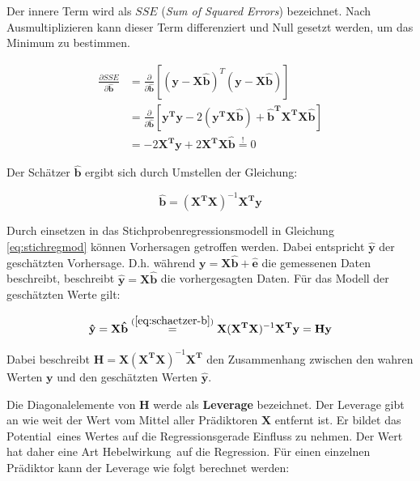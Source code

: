 \documentclass{article}
\numberwithin{equation}{section}
\begin{document}
Der innere Term wird als $SSE$ (\emph{Sum of Squared Errors}) bezeichnet. Nach Ausmultiplizieren kann dieser Term differenziert und Null gesetzt werden, um das Minimum zu bestimmen.

\begin{equation}
\begin{split}
\frac{\partial SSE}{\partial \mathbf{\hat b}} &= \frac{\partial }{\partial \mathbf{\hat b}} \left[ \left( \mathbf{y} - \mathbf{X}\mathbf{\hat b} \right)^T \left( \mathbf{y} - \mathbf{X}\mathbf{\hat b} \right) \right] \\
&= \frac{\partial }{\partial \mathbf{\hat b}} \left[ \mathbf{y^T y} - 2(\mathbf{y^T X \hat b}) + \mathbf{\hat b^T X^T X \hat b} \right] \\
&= -2 \mathbf{X^T y} + 2 \mathbf{X^T X \hat b} \overset{!}{=} 0
\end{split}
\end{equation}

Der Schätzer $\mathbf{\hat b}$ ergibt sich durch Umstellen der Gleichung:

\begin{equation}
\label{eq:schaetzer-b}
\mathbf{\hat b} = (\mathbf{X^T X})^{-1} \mathbf{X^T y}
\end{equation}

Durch einsetzen in das Stichprobenregressionsmodell in Gleichung \ref{eq:stichregmod} können Vorhersagen getroffen werden. Dabei entspricht $\mathbf{\hat y}$ der geschätzten Vorhersage. D.h. während $\mathbf{y} = \mathbf{X}\mathbf{\hat b} + \mathbf{\hat e}$ die gemessenen Daten beschreibt, beschreibt $\mathbf{\hat y} = \mathbf{X}\mathbf{\hat b}$ die vorhergesagten Daten. Für das Modell der geschätzten Werte gilt:

\begin{equation}
\mathbf{\hat y} = \mathbf{X}\mathbf{\hat b} \overset{(\ref{eq:schaetzer-b})}{=} \mathbf{X} (\mathbf{X^T X})^{-1} \mathbf{X^T y} = \mathbf{H y}
\end{equation}

Dabei beschreibt $\mathbf{H} = \mathbf{X} (\mathbf{X^T X})^{-1} \mathbf{X^T}$ den Zusammenhang zwischen den wahren Werten $\mathbf{y}$ und den geschätzten Werten $\mathbf{\hat y}$.

Die Diagonalelemente von $\mathbf{H}$ werde als \textbf{Leverage} bezeichnet. Der Leverage gibt an wie weit der Wert vom Mittel aller Prädiktoren $\mathbf{X}$ entfernt ist. Er bildet das \glqq Potential\grqq\ eines Wertes auf die Regressionsgerade Einfluss zu nehmen. Der Wert hat daher eine Art \glqq Hebelwirkung\grqq\ auf die Regression. Für einen einzelnen Prädiktor kann der Leverage wie folgt berechnet werden:
\end{document}
